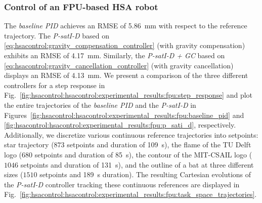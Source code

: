 \subsubsection{Control of an FPU-based HSA robot}
The \emph{baseline PID} achieves an \gls{RMSE} of \SI{5.86}{mm} with respect to the reference trajectory. The \emph{P-satI-D} based on \eqref{eq:hsacontrol:gravity_compensation_controller} (with gravity compensation) exhibits an RMSE of \SI{4.17}{mm}. Similarly, the \emph{P-satI-D + GC} based on \eqref{eq:hsacontrol:gravity_cancellation_controller} (with gravity cancellation) displays an RMSE of \SI{4.13}{mm}.
We present a comparison of the three different controllers for a step response in Fig.~\ref{fig:hsacontrol:hsacontrol:experimental_results:fpu:step_response} and plot the entire trajectories of the \emph{baseline PID} and the \emph{P-satI-D} in Figures~\ref{fig:hsacontrol:hsacontrol:experimental_results:fpu:baseline_pid} and \ref{fig:hsacontrol:hsacontrol:experimental_results:fpu:p_sati_d}, respectively.
Additionally, we discretize various continuous reference trajectories into setpoints: 
star trajectory ($873$ setpoints and duration of \SI{109}{s}), the flame of the TU Delft logo ($680$ setpoints and duration of \SI{85}{s}), the contour of the MIT-CSAIL logo ($1046$ setpoints and duration of \SI{131}{s}), and the outline of a bat at three different sizes ($1510$ setpoints and \SI{189}{s} duration).
The resulting Cartesian evolutions of the \emph{P-satI-D} controller tracking these continuous references are displayed in Fig.~\ref{fig:hsacontrol:hsacontrol:experimental_results:fpu:task_space_trajectories}.

